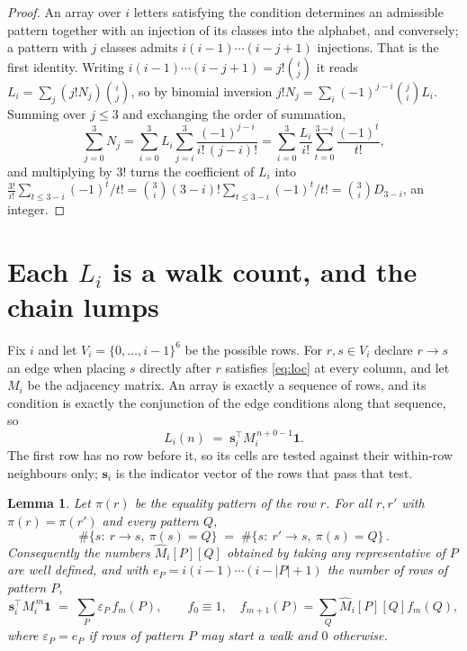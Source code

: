 \documentclass[11pt,a4paper]{article}
\theoremstyle{plain}
\newtheorem{lemma}[theorem]{Lemma}
\theoremstyle{definition}
\begin{document}
\begin{proof}
An array over $i$ letters satisfying the condition determines an admissible pattern together
with an injection of its classes into the alphabet, and conversely; a pattern with $j$
classes admits $i(i-1)\cdots(i-j+1)$ injections. That is the first identity. Writing
$i(i-1)\cdots(i-j+1)=j!\binom{i}{j}$ it reads $L_i=\sum_j (j!N_j)\binom{i}{j}$, so by
binomial inversion $j!N_j=\sum_{i}(-1)^{j-i}\binom{j}{i}L_i$. Summing over
$j\le 3$ and exchanging the order of summation,
\[
\sum_{j=0}^{3}N_j=\sum_{i=0}^{3}L_i\sum_{j=i}^{3}\frac{(-1)^{j-i}}{i!\,(j-i)!}
=\sum_{i=0}^{3}\frac{L_i}{i!}\sum_{t=0}^{3-i}\frac{(-1)^t}{t!} ,
\]
and multiplying by $3!$ turns the coefficient of $L_i$ into
$\frac{3!}{i!}\sum_{t\le 3-i}(-1)^t/t!=\binom{3}{i}(3-i)!\sum_{t\le 3-i}(-1)^t/t!
=\binom{3}{i}D_{3-i}$, an integer.
\end{proof}

\section{Each $L_i$ is a walk count, and the chain lumps}

Fix $i$ and let $V_i=\{0,\dots,i-1\}^{6}$ be the possible rows. For $r,s\in V_i$
declare $r\to s$ an edge when placing $s$ directly after $r$ satisfies \eqref{eq:loc} at
every column, and let $M_i$ be the adjacency matrix. An array is exactly a sequence of
rows, and its condition is exactly the conjunction of the edge conditions along that
sequence, so
\[
L_i(n)\;=\;\mathbf{s}_i^{\!\top}M_i^{\,n+0-1}\mathbf{1} .
\]
The first row has no row before it, so its cells are tested
against their within-row neighbours only; $\mathbf{s}_i$ is the indicator vector of the
rows that pass that test.

\begin{lemma}\label{lem:lump}
Let $\pi(r)$ be the equality pattern of the row $r$. For all $r,r'$ with
$\pi(r)=\pi(r')$ and every pattern $Q$,
\[
\#\{s:\ r\to s,\ \pi(s)=Q\}\;=\;\#\{s:\ r'\to s,\ \pi(s)=Q\}\, .
\]
Consequently the numbers $\widehat M_i[P][Q]$ obtained by taking any representative of $P$
are well defined, and with $e_P=i(i-1)\cdots(i-|P|+1)$ the number of rows of pattern $P$,
\[
\mathbf{s}_i^{\!\top}M_i^{\,m}\mathbf{1}\;=\;\sum_P \varepsilon_P\,f_m(P),
\qquad f_0\equiv1,\quad f_{m+1}(P)=\sum_Q\widehat M_i[P][Q]f_m(Q),
\]
where $\varepsilon_P=e_P$ if rows of pattern $P$ may start a walk and $0$ otherwise.
\end{lemma}
\end{document}
